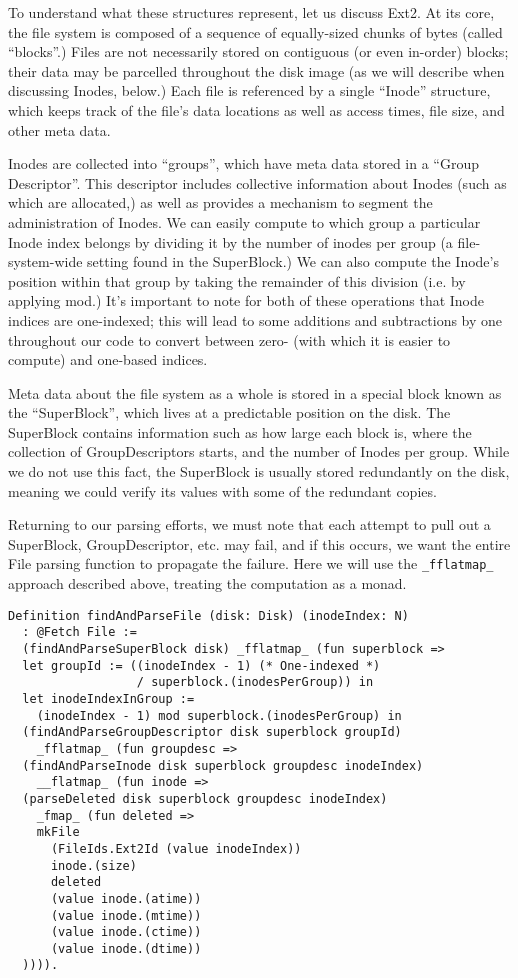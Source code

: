 \documentclass[nocopyrightspace]{sigplanconf}
\begin{document}
To understand what these structures represent, let us discuss Ext2. At its
core, the file system is composed of a sequence of equally-sized chunks of
bytes (called ``blocks''.) Files are not necessarily stored on contiguous (or
even in-order) blocks; their data may be parcelled throughout the disk image
(as we will describe when discussing Inodes, below.) Each file is referenced
by a single ``Inode'' structure, which keeps track of the file's data
locations as well as access times, file size, and other meta data. 

Inodes are collected into ``groups'', which have meta data stored in a ``Group
Descriptor''. This descriptor includes collective information about Inodes
(such as which are allocated,) as well as provides a mechanism to segment the
administration of Inodes. We can easily compute to which group a particular
Inode index belongs by dividing it by the number of inodes per group (a
file-system-wide setting found in the SuperBlock.) We can also compute the
Inode's position within that group by taking the remainder of this division
(i.e. by applying mod.) It's important to note for both of these operations
that Inode indices are one-indexed; this will lead to some additions and
subtractions by one throughout our code to convert between zero- (with which
it is easier to compute) and one-based indices.

Meta data about the file system as a whole is stored in a special block known
as the ``SuperBlock'', which lives at a predictable position on the disk. The
SuperBlock contains information such as how large each block is, where the
collection of GroupDescriptors starts, and the number of Inodes per group.
While we do not use this fact, the SuperBlock is usually stored redundantly on
the disk, meaning we could verify its values with some of the redundant
copies.

Returning to our parsing efforts, we must note that each attempt to pull out a
SuperBlock, GroupDescriptor, etc. may fail, and if this occurs, we want the
entire File parsing function to propagate the failure. Here we will use the
{\tt \_fflatmap\_} approach described above, treating the computation as a
monad.

\begin{lstlisting}
Definition findAndParseFile (disk: Disk) (inodeIndex: N) 
  : @Fetch File :=
  (findAndParseSuperBlock disk) _fflatmap_ (fun superblock =>
  let groupId := ((inodeIndex - 1) (* One-indexed *)
                  / superblock.(inodesPerGroup)) in
  let inodeIndexInGroup := 
    (inodeIndex - 1) mod superblock.(inodesPerGroup) in
  (findAndParseGroupDescriptor disk superblock groupId) 
    _fflatmap_ (fun groupdesc =>
  (findAndParseInode disk superblock groupdesc inodeIndex) 
    __flatmap_ (fun inode =>
  (parseDeleted disk superblock groupdesc inodeIndex) 
    _fmap_ (fun deleted =>
    mkFile
      (FileIds.Ext2Id (value inodeIndex))
      inode.(size)
      deleted
      (value inode.(atime))
      (value inode.(mtime))
      (value inode.(ctime))
      (value inode.(dtime))
  )))).
\end{lstlisting}
\end{document}
